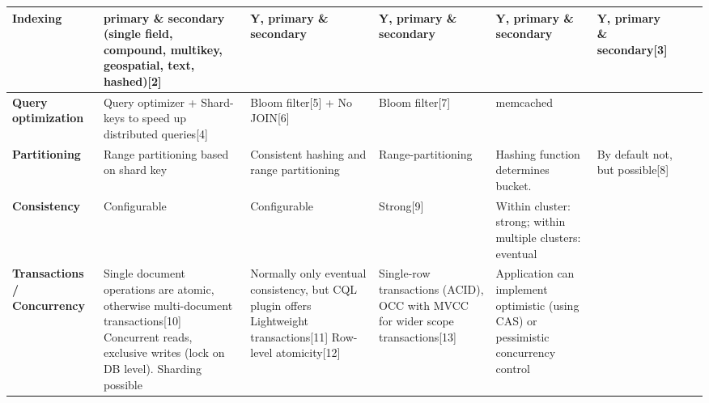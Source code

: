 \documentclass{article}
\begin{document}
\begin{table}[h]
\begin{tabular}{@{}l| L{3cm}| L{3cm}| L{3cm}| L{3cm}| L{3cm}| L{3cm}| L{3cm}|@{}}
\textbf{Indexing}                   & primary \& secondary (single field, compound, multikey, geospatial, text, hashed){[}2{]}                                                                        & Y, primary \& secondary                                                                                                  & Y, primary \& secondary                                                            & Y, primary \& secondary                                                             & Y, primary \& secondary{[}3{]}      \\ \midrule
\textbf{Query optimization}         & Query optimizer + Shard-keys to speed up distributed queries{[}4{]}                                                                                             & Bloom filter{[}5{]} + No JOIN{[}6{]}                                                                                     & Bloom filter{[}7{]}                                                                & memcached                                                                           &                                     \\ \midrule
\textbf{Partitioning}               & Range partitioning based on shard key                                                                                                                           & Consistent hashing and range partitioning                                                                                & Range-partitioning                                                                 & Hashing function determines bucket.                                                 & By default not, but possible{[}8{]} \\ \midrule
\textbf{Consistency}                & Configurable                                                                                                                                                    & Configurable                                                                                                             & Strong{[}9{]}                                                                      & Within cluster: strong; within multiple clusters: eventual                          &                                     \\ \midrule
\textbf{Transactions / Concurrency} & Single document operations are atomic, otherwise multi-document transactions{[}10{]} Concurrent reads, exclusive writes (lock on DB level). Sharding possible & Normally only eventual consistency, but CQL plugin offers Lightweight transactions{[}11{]} Row-level atomicity{[}12{]} & Single-row transactions (ACID), OCC with MVCC for wider scope transactions{[}13{]} & Application can implement optimistic (using CAS) or pessimistic concurrency control &                                     \\ \midrule

\end{tabular}
\end{table}
\end{document}
